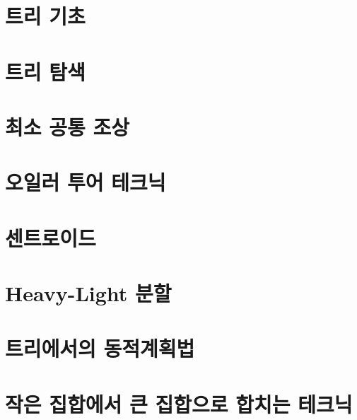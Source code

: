 \chapter{트리 기초}


\chapter{트리 탐색}


\chapter{최소 공통 조상}


\chapter{오일러 투어 테크닉}


\chapter{센트로이드}


\chapter{Heavy-Light 분할}


\chapter{트리에서의 동적계획법}


\chapter{작은 집합에서 큰 집합으로 합치는 테크닉}

